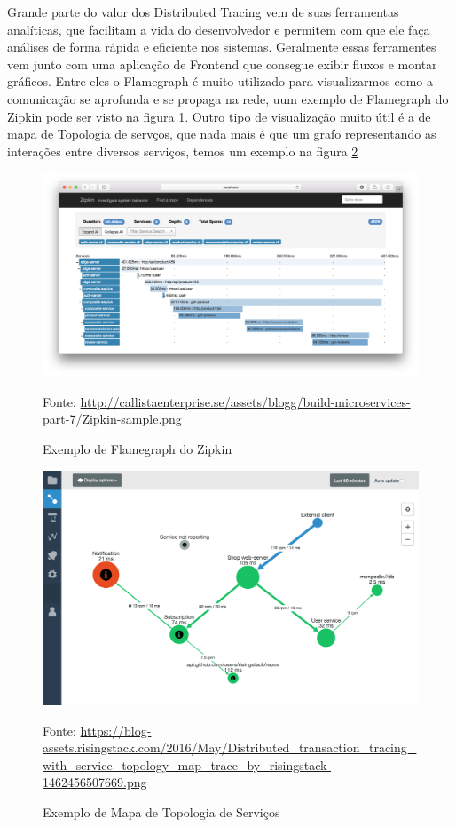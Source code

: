 \documentclass[twosideprint]{politex}
\newcommand{\legend}[1]{\begin{center}\def\caption{}\caption{#1}\end{center}}
\begin{document}
	Grande parte do valor dos Distributed Tracing vem de suas ferramentas analíticas, que facilitam a vida do desenvolvedor e permitem com que ele faça análises de forma rápida e eficiente nos sistemas. Geralmente essas ferramentes vem junto com uma aplicação de Frontend que consegue exibir fluxos e montar gráficos. Entre eles o Flamegraph é muito utilizado para visualizarmos como a comunicação se aprofunda e se propaga na rede, uum exemplo de Flamegraph do Zipkin pode ser visto na figura \ref{fig_zipking_sample}. Outro tipo de visualização muito útil é a de mapa de Topologia de servços, que nada mais é que um grafo representando as interações entre diversos serviços, temos um exemplo na figura \ref{fig_topology_map}
	
	\begin{figure}[htb]
		\caption{\label{fig_zipking_sample}Exemplo de Flamegraph do Zipkin}
		\begin{center}
		\includegraphics[scale=0.16]{pictures/zipkin-sample.png}
		\end{center}
		\legend{Fonte: \url{http://callistaenterprise.se/assets/blogg/build-microservices-part-7/Zipkin-sample.png}}
	\end{figure}
	
	\begin{figure}[htb]
		\caption{\label{fig_topology_map}Exemplo de Mapa de Topologia de Serviços}
		\begin{center}
		\includegraphics[scale=0.16]{pictures/service_topology_map.png}
		\end{center}
		\legend{Fonte: \url{https://blog-assets.risingstack.com/2016/May/Distributed_transaction_tracing_with_service_topology_map_trace_by_risingstack-1462456507669.png}}
	\end{figure}
	
\end{document}

